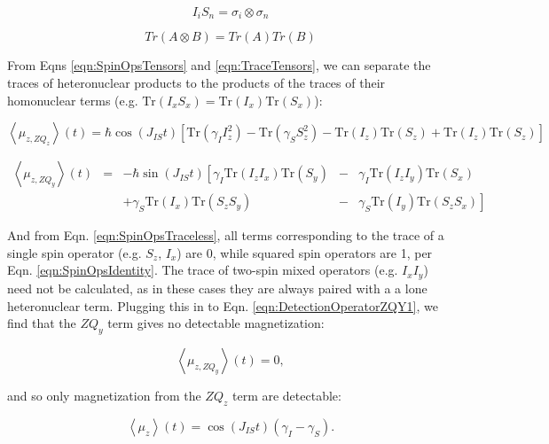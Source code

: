 \documentclass[PaulGanssle-Thesis.tex]{subfiles}
\begin{document}
\begin{equation}
\label{eqn:SpinOpsTensors}
I_{i}S_{n} = \sigma_{i}\otimes\sigma_{n}
\end{equation}

\begin{equation}
\label{eqn:TraceTensors}
Tr(A\otimes B) = Tr(A)Tr(B)
\end{equation} 

From Eqns \ref{eqn:SpinOpsTensors} and \ref{eqn:TraceTensors}, we can separate the traces of heteronuclear products to the products of the traces of their homonuclear terms (e.g. $\mathrm{Tr}(I_{x}S_{x}) = \mathrm{Tr}(I_{x})\mathrm{Tr}(S_{x})$):

\begin{equation}
\label{eqn:DetectionOperatorZQZ1}
\left\langle\mu_{z,ZQ_{z}}\right\rangle(t) = \hbar\cos(J_{IS}t)\left[\mathrm{Tr}(\gamma_{I}I_{z}^2) - \mathrm{Tr}(\gamma_{S}S_{z}^2) - \mathrm{Tr}(I_{z})\mathrm{Tr}(S_{z}) + \mathrm{Tr}(I_{z})\mathrm{Tr}(S_{z})\right]
\end{equation}

\begin{align}
\left\langle\mu_{z,ZQ_{y}}\right\rangle(t) & = & -\hbar\sin(J_{IS}t)\left[\gamma_{I}\mathrm{Tr}(I_{z}I_{x})\mathrm{Tr}(S_{y}) \right. & - & \gamma_{I}\mathrm{Tr}(I_{z}I_{y})\mathrm{Tr}(S_{x}) \\
& &+ \gamma_{S}\mathrm{Tr}(I_{x})\mathrm{Tr}(S_{z}S_{y}) &-&\left. \gamma_{S}\mathrm{Tr}(I_{y})\mathrm{Tr}(S_{z}S_{x})\right]
\label{eqn:DetectionOperatorZQY1}
\end{align}

And from Eqn. \ref{eqn:SpinOpsTraceless}, all terms corresponding to the trace of a single spin operator (e.g. $S_z$, $I_x$) are 0, while squared spin operators are 1, per Eqn. \ref{eqn:SpinOpsIdentity}. The trace of two-spin mixed operators (e.g. $I_{x}I_{y}$) need not be calculated, as in these cases they are always paired with a a lone heteronuclear term. Plugging this in to Eqn. \ref{eqn:DetectionOperatorZQY1}, we find that the $ZQ_{y}$ term gives no detectable magnetization:

\begin{equation}
\label{eqn:DetectionOperatorZQY2}
\left\langle\mu_{z, ZQ_{y}}\right\rangle(t) = 0,
\end{equation}

and so only magnetization from the $ZQ_{z}$ term are detectable:

\begin{equation}
\label{eqn:DetectionOperatorTwoSpinFinal}
\left\langle\mu_{z}\right\rangle(t) = \cos(J_{IS}t)(\gamma_{I} - \gamma_{S}).
\end{equation}
\end{document}
